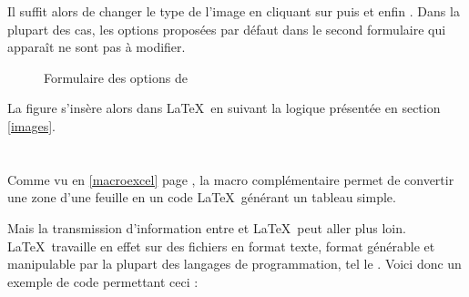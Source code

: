 Il suffit alors de changer le type de l'image en cliquant sur  puis  et enfin . Dans la plupart des cas, les options proposées par défaut dans le second formulaire qui apparaît ne sont pas à modifier.

\begin{figure}[H]
\centering
{}
\caption{Formulaire des options  de }
\end{figure}

La figure s'insère alors dans \LaTeX\ en suivant la logique présentée en section \ref{images}.

\section{}

Comme vu en \ref{macroexcel} page \pageref{macroexcel}, la macro complémentaire  permet de convertir une zone d'une feuille  en un code \LaTeX\ générant un tableau simple.

Mais la transmission d'information entre  et \LaTeX\ peut aller plus loin. \LaTeX\ travaille en effet sur des fichiers en format texte, format générable et manipulable par la plupart des langages de programmation, tel le . Voici donc un exemple de code  permettant ceci :



